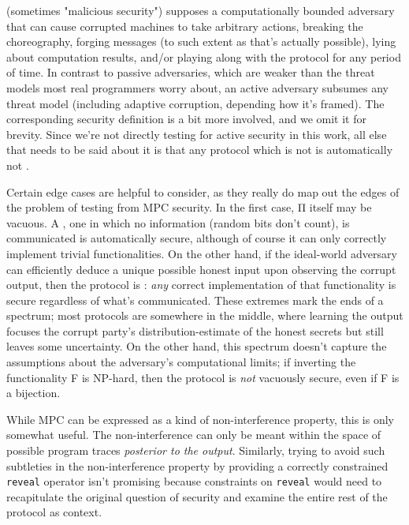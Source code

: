 \documentclass[conference]{IEEEtran}
\begin{document}
 (sometimes "malicious security")
supposes a computationally bounded adversary that can cause corrupted machines to take arbitrary actions,
breaking the choreography,
forging messages (to such extent as that's actually possible),
lying about computation results,
and/or playing along with the protocol for any period of time.
In contrast to passive adversaries, which are weaker than the threat models most real programmers worry about,
an active adversary subsumes any threat model (including adaptive corruption, depending how it's framed).
The corresponding security definition is a bit more involved, and we omit it for brevity.
Since we're not directly testing for active security in this work,
all else that needs to be said about it is that
any protocol which is not  is automatically not .

Certain edge cases are helpful to consider, as they really do map out the edges of the problem of testing from MPC security.
In the first case, Π itself may be vacuous.
A , one in which no information (random bits don't count), is communicated is automatically secure,
although of course it can only correctly implement trivial functionalities.
On the other hand, if the ideal-world adversary can efficiently deduce a unique possible honest input upon observing the corrupt output,
then the protocol is : \textit{any} correct implementation of that functionality is secure regardless of what's communicated.
These extremes mark the ends of a spectrum; most protocols are somewhere in the middle,
where learning the output focuses the corrupt party's distribution-estimate of the honest secrets but still leaves some uncertainty.
On the other hand, this spectrum doesn't capture the assumptions about the adversary's computational limits;
if inverting the functionality F is NP-hard, then the protocol is \textit{not} vacuously secure, even if F is a bijection.

While MPC can be expressed as a kind of non-interference property, this is only somewhat useful.
The non-interference can only be meant within the space of possible program traces \textit{posterior to the output}.
Similarly, trying to avoid such subtleties in the non-interference property by providing a correctly constrained \texttt{reveal} operator
isn't promising because constraints on \texttt{reveal} would need to recapitulate the original question of security
and examine the entire rest of the protocol as context.
\end{document}
